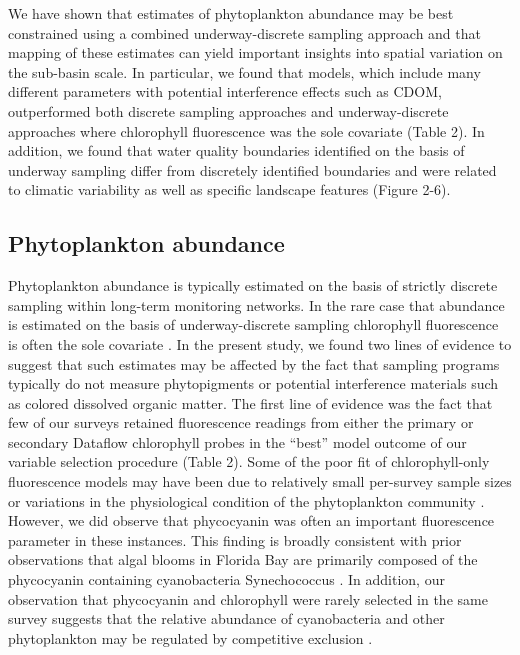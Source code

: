 \documentclass[review]{elsarticle}
\begin{document}
We have shown that estimates of phytoplankton abundance may be best constrained using a combined underway-discrete sampling approach and that mapping of these estimates can yield important insights into spatial variation on the sub-basin scale. In particular, we found that models, which include many different parameters with potential interference effects such as CDOM, outperformed both discrete sampling approaches and underway-discrete approaches where chlorophyll fluorescence was the sole covariate (Table 2). In addition, we found that water quality boundaries identified on the basis of underway sampling differ from discretely identified boundaries and were related to climatic variability as well as specific landscape features (Figure 2-6).

\subsection{Phytoplankton abundance}

Phytoplankton abundance is typically estimated on the basis of strictly discrete sampling within long-term monitoring networks. In the rare case that abundance is estimated on the basis of underway-discrete sampling chlorophyll fluorescence is often the sole covariate \citep{lane_effects_2007}. In the present study, we found two lines of evidence to suggest that such estimates may be affected by the fact that sampling programs typically do not measure phytopigments or potential interference materials such as colored dissolved organic matter. The first line of evidence was the fact that few of our surveys retained fluorescence readings from either the primary or secondary Dataflow chlorophyll probes in the “best” model outcome of our variable selection procedure (Table 2). Some of the poor fit of chlorophyll-only fluorescence models may have been due to relatively small per-survey sample sizes or variations in the physiological condition of the phytoplankton community \citep{goldman2013estimation}. However, we did observe that phycocyanin was often an important fluorescence parameter in these instances. This finding is broadly consistent with prior observations that algal blooms in Florida Bay are primarily composed of the phycocyanin containing cyanobacteria Synechococcus \citep{phlips_blooms_1999, shangguan2017phytoplankton}. In addition, our observation that phycocyanin and chlorophyll were rarely selected in the same survey suggests that the relative abundance of cyanobacteria and other phytoplankton may be regulated by competitive exclusion \citep{passarge2006competition}. 
\end{document}
